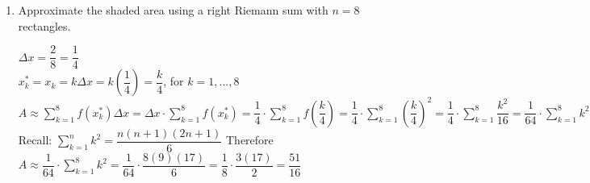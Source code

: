 \documentclass{ximera}
\begin{document}
\begin{problem}
\begin{enumerate}
\begin{explanation}
 $A\approx \displaystyle \sum_{k=1}^{4}  f ( x_k^* ) \Delta x =f\left(\dfrac{1}{2}\right)\Delta x+ f(1)\Delta x+f\left(\dfrac{3}{2}\right)+ f(2)\Delta x=\Delta x\left(f\left(\dfrac{1}{2}\right)+f(1)+f\left(\dfrac{3}{2}\right)+f(2)\right)$\\
 $A\approx \dfrac{1}{2}\left(\dfrac{1}{4}+1+\dfrac{9}{4}+4\right)=\dfrac{5}{2}+5=\dfrac{15}{2}$\\

\end{explanation}
\item Approximate the shaded area using a right Riemann sum with $n=8$ rectangles.
\begin{explanation}
 $\Delta x=\dfrac{2}{8}=\dfrac{1}{4}$\\
  $ x_k^*=x_k=k\Delta x=k\left(\dfrac{1}{4}\right)=\dfrac{k}{4}$, for $k=1,...,8$\\

 $A\approx \displaystyle \sum_{k=1}^{8}  f ( x_k^* ) \Delta x = \Delta x\cdot\displaystyle \sum_{k=1}^{8}  f ( x_k^* )=\dfrac{1}{4}\cdot\displaystyle \sum_{k=1}^{8} f \left( \dfrac{k}{4} \right)=\dfrac{1}{4}\cdot\displaystyle \sum_{k=1}^{8}  \left( \dfrac{k}{4} \right)^2= \dfrac{1}{4}\cdot\displaystyle \sum_{k=1}^{8}  \dfrac{k^2}{16} = \dfrac{1}{64}\cdot\displaystyle \sum_{k=1}^{8}k^2 $ \\[1em]
Recall: $\displaystyle \sum_{k=1}^{n} k^2 =\dfrac{n(n+1)(2n+1)}{6}$
Therefore\\
 $A\approx \dfrac{1}{64}\cdot\displaystyle \sum_{k=1}^{8}k^2 = \dfrac{1}{64}\cdot\dfrac{8(9)(17)}{6}= \dfrac{1}{8}\cdot\dfrac{3(17)}{2}=\dfrac{51}{16}$ 
\end{explanation}
\end{enumerate}	
\end{problem}
\end{document}
